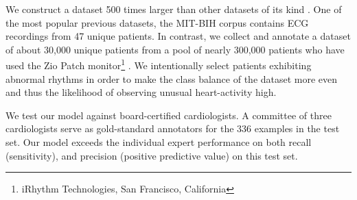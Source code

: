 We construct a dataset 500 times larger than other datasets of its kind
\cite{moody2001impact, goldberger2000physiobank}. One of the most popular
previous datasets, the MIT-BIH corpus contains ECG recordings from 47 unique
patients. In contrast, we collect and annotate a dataset of about 30,000 unique
patients from a pool of nearly 300,000 patients who have used the Zio Patch
monitor\footnote[1]{iRhythm Technologies, San Francisco, California}
\cite{turakhia2013diagnostic}. We intentionally select patients exhibiting
abnormal rhythms in order to make the class balance of the dataset more even
and thus the likelihood of observing unusual heart-activity high.

We test our model against board-certified cardiologists. A committee of three
cardiologists serve as gold-standard annotators for the 336 examples in the
test set. Our model exceeds the individual expert performance on both recall
(sensitivity), and precision (positive predictive value) on this test set.
